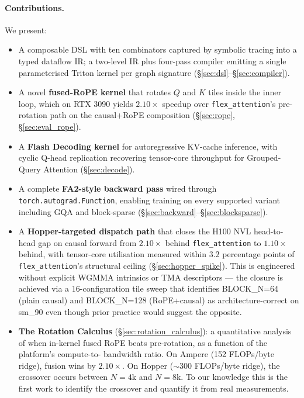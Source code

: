 \documentclass[10pt,twocolumn]{article}
\begin{document}
\paragraph{Contributions.}
We present:

\begin{itemize}[leftmargin=1.2em,itemsep=2pt]
  \item A composable DSL with ten combinators captured by symbolic
        tracing into a typed dataflow IR; a two-level IR plus
        four-pass compiler emitting a single parameterised Triton
        kernel per graph signature (\S\ref{sec:dsl}--\S\ref{sec:compiler}).

  \item A novel \textbf{fused-RoPE kernel} that rotates $Q$ and $K$
        tiles inside the inner loop, which on RTX 3090 yields
        $2.10\times$ speedup over \texttt{flex\_attention}'s
        pre-rotation path on the causal+RoPE composition
        (\S\ref{sec:rope}, \S\ref{sec:eval_rope}).

  \item A \textbf{Flash Decoding kernel} for autoregressive KV-cache
        inference, with cyclic Q-head replication recovering
        tensor-core throughput for Grouped-Query Attention
        (\S\ref{sec:decode}).

  \item A complete \textbf{FA2-style backward pass} wired through
        \texttt{torch.autograd.Function}, enabling training on every
        supported variant including GQA and block-sparse
        (\S\ref{sec:backward}--\S\ref{sec:blocksparse}).

  \item A \textbf{Hopper-targeted dispatch path} that closes the
        H100 NVL head-to-head gap on causal forward from
        $2.10\times$ behind \texttt{flex\_attention} to
        $1.10\times$ behind, with tensor-core utilisation measured
        within $3.2$ percentage points of
        \texttt{flex\_attention}'s structural ceiling
        (\S\ref{sec:hopper_spike}). This is engineered without
        explicit WGMMA intrinsics or TMA descriptors --- the closure
        is achieved via a 16-configuration tile sweep that
        identifies BLOCK\_N=64 (plain causal) and BLOCK\_N=128
        (RoPE+causal) as architecture-correct on sm\_90 even though
        prior practice would suggest the opposite.

  \item \textbf{The Rotation Calculus} (\S\ref{sec:rotation_calculus}):
        a quantitative analysis of when in-kernel fused RoPE beats
        pre-rotation, as a function of the platform's compute-to-
        bandwidth ratio. On Ampere (152 FLOPs/byte ridge), fusion
        wins by $2.10\times$. On Hopper ($\sim 300$ FLOPs/byte
        ridge), the crossover occurs between $N{=}4\text{k}$ and
        $N{=}8\text{k}$. To our knowledge this is the first work to
        identify the crossover and quantify it from real
        measurements.


\end{itemize}
\end{document}
